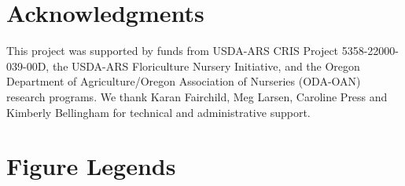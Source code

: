 \documentclass[12pt]{article}
\begin{document}



\section*{\sffamily\normalsize{Acknowledgments}}
This project was supported by funds from USDA-ARS CRIS Project 5358-22000-039-00D, the USDA-ARS Floriculture Nursery Initiative, and the Oregon Department of Agriculture/Oregon Association of Nurseries (ODA-OAN) research programs. We thank Karan Fairchild, Meg Larsen, Caroline Press and Kimberly Bellingham for technical and administrative support. 

\renewcommand\refname{Literature Cited}


\clearpage

\section*{Figure Legends}



\end{document}
